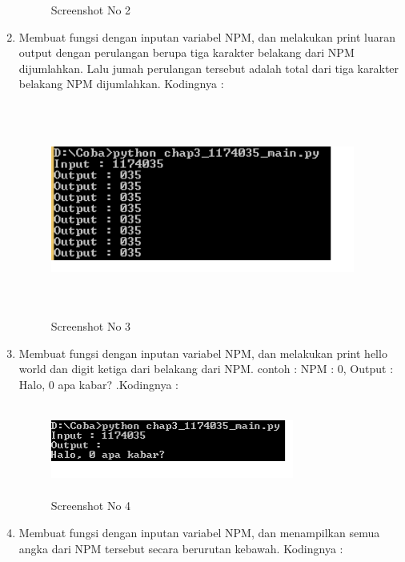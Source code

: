 \begin{enumerate}
\begin{figure}[!htbp]
        \caption{Screenshot No 2}
        \label{1174035_2}
	\end{figure}
	\item Membuat fungsi dengan inputan variabel NPM, dan melakukan print luaran output dengan perulangan berupa tiga karakter belakang dari NPM dijumlahkan. Lalu jumah perulangan tersebut adalah total dari tiga karakter belakang NPM dijumlahkan. Kodingnya : 
	
	\begin{figure}[!htbp]
        \centering
        \includegraphics[height=7cm, width=10cm]{figures/chapter3/1174035_3.png}
        \caption{Screenshot No 3}
        \label{1174035_3}
	\end{figure}
	\item Membuat fungsi dengan inputan variabel NPM, dan melakukan print hello world dan digit ketiga dari belakang dari NPM. contoh : NPM : 0, Output : Halo, 0 apa kabar? .Kodingnya : 
	
	\begin{figure}[!htbp]
        \centering
        \includegraphics[height=3cm, width=8cm]{figures/chapter3/1174035_4.png}
        \caption{Screenshot No 4}
        \label{1174035_4}
	\end{figure}
	\item Membuat fungsi dengan inputan variabel NPM, dan menampilkan semua angka dari NPM tersebut secara berurutan kebawah. Kodingnya : 
	
	\begin{figure}[!htbp]
        \centering

\end{figure}
\end{enumerate}

